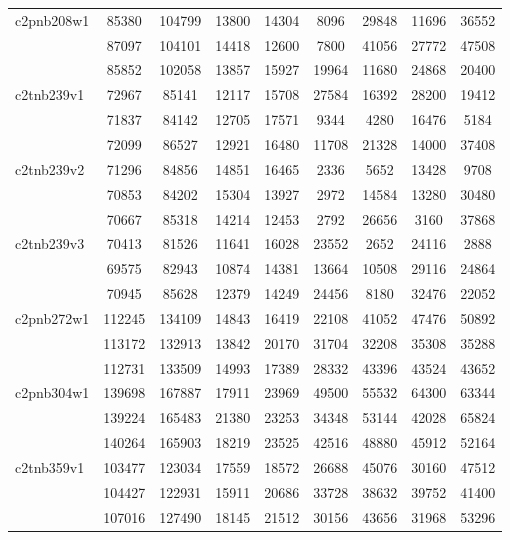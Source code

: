 \documentclass[a4paper]{article}
\begin{document}
\begin{center}
\begin{longtable}{ |l|c|c|c|c|c|c|c|c| }
c2pnb208w1 & 85380 & 104799 & 13800 & 14304 & 8096 & 29848 & 11696 & 36552 \\
& 87097 & 104101 & 14418 & 12600 & 7800 & 41056 & 27772 & 47508 \\ 
& 85852 & 102058 & 13857 & 15927 & 19964 & 11680 & 24868 & 20400 \\ \hline

c2tnb239v1 & 72967 & 85141 & 12117 & 15708 & 27584 & 16392 & 28200 & 19412 \\ 
& 71837 & 84142 & 12705 & 17571 & 9344 & 4280 & 16476 & 5184 \\ 
& 72099 & 86527 & 12921 & 16480 & 11708 & 21328 & 14000 & 37408 \\ \hline

c2tnb239v2 & 71296 & 84856 & 14851 & 16465 & 2336 & 5652 & 13428 & 9708 \\ 
& 70853 & 84202 & 15304 & 13927 & 2972 & 14584 & 13280 & 30480 \\
& 70667 & 85318 & 14214 & 12453 & 2792 & 26656 & 3160 & 37868 \\ \hline

c2tnb239v3 & 70413 & 81526 & 11641 & 16028 & 23552 & 2652 & 24116 & 2888 \\
& 69575 & 82943 & 10874 & 14381 & 13664 & 10508 & 29116 & 24864 \\
& 70945 & 85628 & 12379 & 14249 & 24456 & 8180 & 32476 & 22052 \\ \hline

c2pnb272w1 & 112245 & 134109 & 14843 & 16419 & 22108 & 41052 & 47476 & 50892 \\
& 113172 & 132913 & 13842 & 20170 & 31704 & 32208 & 35308 & 35288 \\ 
& 112731 & 133509 & 14993 & 17389 & 28332 & 43396 & 43524 & 43652 \\ \hline

c2pnb304w1 & 139698 & 167887 & 17911 & 23969 & 49500 & 55532 & 64300 & 63344 \\ 
& 139224 & 165483 & 21380 & 23253 & 34348 & 53144 & 42028 & 65824 \\ 
& 140264 & 165903 & 18219 & 23525 & 42516 & 48880 & 45912 & 52164 \\ \hline

c2tnb359v1 & 103477 & 123034 & 17559 & 18572 & 26688 & 45076 & 30160 & 47512 \\
& 104427 & 122931 & 15911 & 20686 & 33728 & 38632 & 39752 & 41400 \\
& 107016 & 127490 & 18145 & 21512 & 30156 & 43656 & 31968 & 53296 \\ \hline


\end{longtable}
\end{center}
\end{document}
